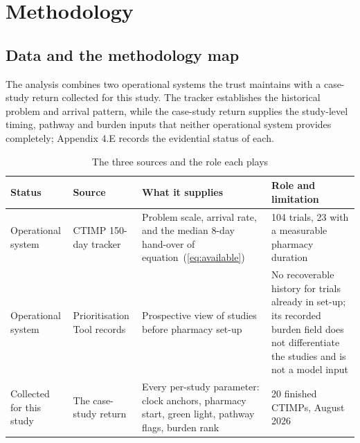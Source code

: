 
\chapter{Methodology}
\label{ch:method}

\section{Data and the methodology map}
\label{sec:datasources}

The analysis combines two operational systems the trust maintains with a case-study return collected for this study. The tracker establishes the historical problem and arrival pattern, while the case-study return supplies the study-level timing, pathway and burden inputs that neither operational system provides completely; Appendix 4.E records the evidential status of each.

\begin{table}[htbp]
  \centering
  \caption{The three sources and the role each plays}
  \label{tab:sources}
  \begin{tabularx}{\textwidth}{@{}lLLL@{}}
    \toprule
    \textbf{Status} & \textbf{Source} & \textbf{What it supplies} & \textbf{Role and limitation} \\
    \midrule
    Operational system & CTIMP 150-day tracker & Problem scale, arrival rate, and the median 8-day hand-over of equation~(\ref{eq:available}) & 104 trials, 23 with a measurable pharmacy duration \\
    \addlinespace
    Operational system & Prioritisation Tool records & Prospective view of studies before pharmacy set-up & No recoverable history for trials already in set-up; its recorded burden field does not differentiate the studies and is not a model input \\
    \addlinespace
    Collected for this study & The case-study return & Every per-study parameter: clock anchors, pharmacy start, green light, pathway flags, burden rank & 20 finished CTIMPs, August 2026 \\
    \bottomrule
  \end{tabularx}
\end{table}

